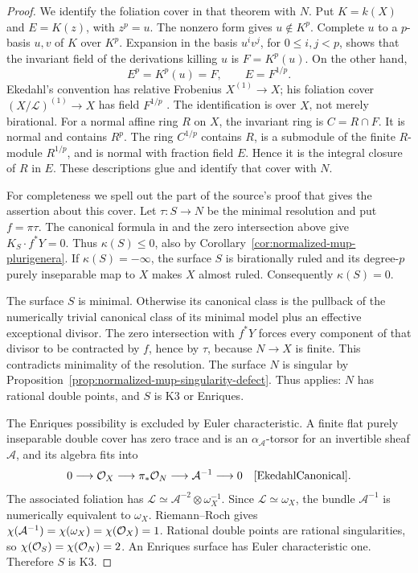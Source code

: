 \begin{proof}
We identify the foliation cover in that theorem with $N$.
Put $K=k(X)$ and $E=K(z)$, with $z^p=u$. The nonzero form gives
$u\notin K^p$. Complete $u$ to a $p$-basis $u,v$ of $K$ over
$K^p$. Expansion in the basis $u^iv^j$, for $0\leq i,j<p$,
shows that the invariant field of the derivations killing $u$ is
$F=K^p(u)$. On the other hand,
\[
 E^p=K^p(u)=F,\qquad E=F^{1/p}.
\]
Ekedahl's convention has relative Frobenius $X^{(1)}\to X$;
his foliation cover $(X/\mathcal L)^{(1)}\to X$ has field
$F^{1/p}$ \cite[p.~104]{EkedahlCanonical}.
The identification is over $X$, not merely birational. For a
normal affine ring $R$ on $X$, the invariant ring is $C=R\cap F$.
It is normal and contains $R^p$. The ring $C^{1/p}$ contains $R$,
is a submodule of the finite $R$-module $R^{1/p}$, and is normal
with fraction field $E$. Hence it is the integral closure of $R$
in $E$. These descriptions glue and identify that cover with $N$.

For completeness we spell out the part of the source's proof
that gives the assertion about this cover. Let $\tau:S\to N$
be the minimal resolution and put $f=\pi\tau$. The canonical
formula in \cite[I, Proposition~2.1, p.~108]{EkedahlCanonical}
and the zero intersection above give $K_S\cdot f^*Y=0$.
Thus $\kappa(S)\leq0$, also by
Corollary~\ref{cor:normalized-mup-plurigenera}. If
$\kappa(S)=-\infty$, the surface $S$ is birationally ruled and
its degree-$p$ purely inseparable map to $X$ makes $X$ almost
ruled. Consequently $\kappa(S)=0$.

The surface $S$ is minimal. Otherwise its canonical class is the
pullback of the numerically trivial canonical class of its minimal
model plus an effective exceptional divisor. The zero intersection
with $f^*Y$ forces every component of that divisor to be contracted
by $f$, hence by $\tau$, because $N\to X$ is finite. This
contradicts minimality of the resolution. The surface $N$ is
singular by Proposition~\ref{prop:normalized-mup-singularity-defect}.
Thus \cite[I, Lemma~2.5, p.~111]{EkedahlCanonical} applies:
$N$ has rational double points, and $S$ is K3 or Enriques.

The Enriques possibility is excluded by Euler characteristic.
A finite flat purely inseparable double cover has zero trace and is an
$\alpha_{\mathcal A}$-torsor for an invertible sheaf $\mathcal A$,
and its algebra fits into
\[
 0\longrightarrow\OO_X\longrightarrow\pi_*\OO_N
 \longrightarrow\mathcal A^{-1}\longrightarrow0
 \quad\text{\cite[I, Proposition~1.11, p.~107]{EkedahlCanonical}}.
\]
The associated foliation has
$\mathcal L\simeq\mathcal A^{-2}\otimes\omega_X^{-1}$.
Since $\mathcal L\simeq\omega_X$, the bundle
$\mathcal A^{-1}$ is numerically equivalent to $\omega_X$.
Riemann--Roch gives
$\chi(\mathcal A^{-1})=\chi(\omega_X)=\chi(\mathcal O_X)=1$.
Rational double points are rational singularities, so
$\chi(\mathcal O_S)=\chi(\mathcal O_N)=2$. An Enriques surface has Euler
characteristic one. Therefore $S$ is K3.


\end{proof}
